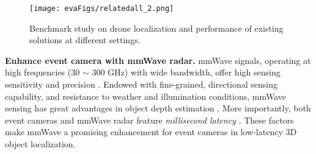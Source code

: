\begin{figure*}[t]
    \setlength{\abovecaptionskip}{0.2cm} %
    \setlength{\belowcaptionskip}{-0.3cm}
    \setlength{\subfigcapskip}{-0.25cm}
    \centering
        \texttt{[image: evaFigs/relatedall\_2.png]}
        \vspace{-0.2cm}
    \caption{Benchmark study on drone localization and performance of existing solutions at different settings.}
    \label{relatedwork}
    \vspace{-0.2cm}
\end{figure*} 

\noindent \textbf{Enhance event camera with mmWave radar.}
mmWave signals, operating at high frequencies (30 $\sim$ 300 GHz) with wide bandwidth, offer high sensing sensitivity and precision \cite{fiandrino2019scaling, zhang2023survey}.
Endowed with fine-grained, directional sensing capability, and resistance to weather and illumination conditions, mmWave sensing has great advantages in object depth estimation \cite{sie2023batmobility, iizuka2023millisign, lu2020see, lu2020milliego}.
More importantly, both event cameras and mmWave radar feature \textit{millisecond latency} \cite{mmWaveUser}. These factors make mmWave a promising enhancement for event cameras in low-latency 3D object localization.

